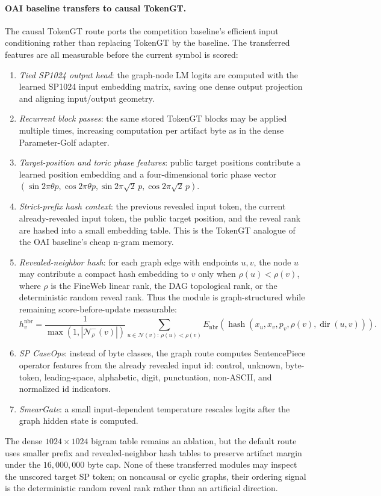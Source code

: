 \documentclass[11pt]{article}
\theoremstyle{definition}
\theoremstyle{plain}
\theoremstyle{remark}
\numberwithin{equation}{section}
\begin{document}
\paragraph{OAI baseline transfers to causal TokenGT.}
The causal TokenGT route ports the competition baseline's efficient input
conditioning rather than replacing TokenGT by the baseline.  The transferred
features are all measurable before the current symbol is scored:
\begin{enumerate}[leftmargin=2em]
  \item \emph{Tied SP1024 output head}: the graph-node LM logits are computed
  with the learned SP1024 input embedding matrix, saving one dense output
  projection and aligning input/output geometry.
  \item \emph{Recurrent block passes}: the same stored TokenGT blocks may be
  applied multiple times, increasing computation per artifact byte as in the
  dense Parameter-Golf adapter.
  \item \emph{Target-position and toric phase features}: public target
  positions contribute a learned position embedding and a four-dimensional
  toric phase vector
  $(\sin 2\pi\theta p,\cos 2\pi\theta p,\sin 2\pi\sqrt2\,p,\cos 2\pi\sqrt2\,p)$.
  \item \emph{Strict-prefix hash context}: the previous revealed input token,
  the current already-revealed input token, the public target position, and
  the reveal rank are hashed into a small embedding table.  This is the
  TokenGT analogue of the OAI baseline's cheap n-gram memory.
  \item \emph{Revealed-neighbor hash}: for each graph edge with endpoints
  $u,v$, the node $u$ may contribute a compact hash embedding to $v$ only when
  $\rho(u)<\rho(v)$, where $\rho$ is the FineWeb linear rank, the DAG
  topological rank, or the deterministic random reveal rank.  Thus the module
  is graph-structured while remaining score-before-update measurable:
  \[
    h_v^{\mathrm{nbr}}
    =
    \frac{1}{\max(1,|\mathcal N^-_\rho(v)|)}
    \sum_{u\in\mathcal N(v):\,\rho(u)<\rho(v)}
    E_{\mathrm{nbr}}\!\left(
      \operatorname{hash}(x_u,x_v,p_v,\rho(v),\operatorname{dir}(u,v))
    \right).
  \]
  \item \emph{SP CaseOps}: instead of byte classes, the graph route computes
  SentencePiece operator features from the already revealed input id: control,
  unknown, byte-token, leading-space, alphabetic, digit, punctuation, non-ASCII,
  and normalized id indicators.
  \item \emph{SmearGate}: a small input-dependent temperature rescales logits
  after the graph hidden state is computed.
\end{enumerate}
The dense $1024\times1024$ bigram table remains an ablation, but the default
route uses smaller prefix and revealed-neighbor hash tables to preserve
artifact margin under the $16{,}000{,}000$ byte cap.  None of these transferred
modules may inspect the unscored target SP token; on noncausal or cyclic
graphs, their ordering signal is the deterministic random reveal rank rather
than an artificial direction.
\end{document}
